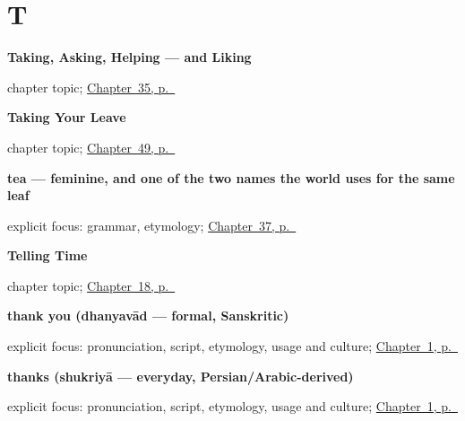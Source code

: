 \section*{T}

\noindent\begin{minipage}[t]{\linewidth}
\raggedright
\textbf{Taking, Asking, Helping — and Liking}\par
\footnotesize chapter topic; \hyperref[ch:hi-pasand]{Chapter~35, p.~\pageref*{ch:hi-pasand}}
\end{minipage}\par\smallskip

\noindent\begin{minipage}[t]{\linewidth}
\raggedright
\textbf{Taking Your Leave}\par
\footnotesize chapter topic; \hyperref[ch:hi-taking-leave]{Chapter~49, p.~\pageref*{ch:hi-taking-leave}}
\end{minipage}\par\smallskip

\noindent\begin{minipage}[t]{\linewidth}
\raggedright
\textbf{tea — feminine, and one of the two names the world uses for the same leaf}\enspace\emph{}\par
\footnotesize explicit focus: grammar, etymology; \hyperref[ch:hi-one-tea-please]{Chapter~37, p.~\pageref*{ch:hi-one-tea-please}}
\end{minipage}\par\smallskip

\noindent\begin{minipage}[t]{\linewidth}
\raggedright
\textbf{Telling Time}\par
\footnotesize chapter topic; \hyperref[ch:hi-telling-time]{Chapter~18, p.~\pageref*{ch:hi-telling-time}}
\end{minipage}\par\smallskip

\noindent\begin{minipage}[t]{\linewidth}
\raggedright
\textbf{thank you (dhanyavād — formal, Sanskritic)}\enspace\emph{}\par
\footnotesize explicit focus: pronunciation, script, etymology, usage and culture; \hyperref[ch:greetings]{Chapter~1, p.~\pageref*{ch:greetings}}
\end{minipage}\par\smallskip

\noindent\begin{minipage}[t]{\linewidth}
\raggedright
\textbf{thanks (shukriyā — everyday, Persian/Arabic-derived)}\enspace\emph{}\par
\footnotesize explicit focus: pronunciation, script, etymology, usage and culture; \hyperref[ch:greetings]{Chapter~1, p.~\pageref*{ch:greetings}}
\end{minipage}\par\smallskip

